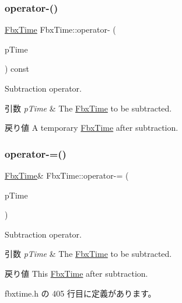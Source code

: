 \subsubsection{\texorpdfstring{operator-\/()}{operator-()}}
{\footnotesize\ttfamily \hyperlink{class_fbx_time}{Fbx\+Time} Fbx\+Time\+::operator-\/ (\begin{DoxyParamCaption}\item[{const \hyperlink{class_fbx_time}{Fbx\+Time} \&}]{p\+Time }\end{DoxyParamCaption}) const}

Subtraction operator. 
\begin{DoxyParams}{引数}
{\em p\+Time} & The \hyperlink{class_fbx_time}{Fbx\+Time} to be subtracted. \\
\hline
\end{DoxyParams}
\begin{DoxyReturn}{戻り値}
A temporary \hyperlink{class_fbx_time}{Fbx\+Time} after subtraction. 
\end{DoxyReturn}
\mbox{\label{class_fbx_time_a66c56bd9467f4480dff65b0686593f8f}} 
\subsubsection{\texorpdfstring{operator-\/=()}{operator-=()}}
{\footnotesize\ttfamily \hyperlink{class_fbx_time}{Fbx\+Time}\& Fbx\+Time\+::operator-\/= (\begin{DoxyParamCaption}\item[{const \hyperlink{class_fbx_time}{Fbx\+Time} \&}]{p\+Time }\end{DoxyParamCaption})\hspace{0.3cm}{\ttfamily [inline]}}

Subtraction operator. 
\begin{DoxyParams}{引数}
{\em p\+Time} & The \hyperlink{class_fbx_time}{Fbx\+Time} to be subtracted. \\
\hline
\end{DoxyParams}
\begin{DoxyReturn}{戻り値}
This \hyperlink{class_fbx_time}{Fbx\+Time} after subtraction. 
\end{DoxyReturn}


 fbxtime.\+h の 405 行目に定義があります。

\mbox{\label{class_fbx_time_ad135636b4c52caa325aa174650f33bc0}} 
